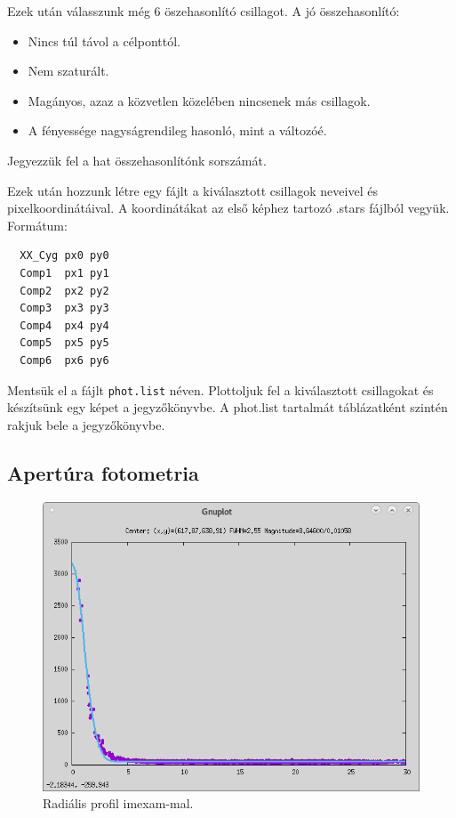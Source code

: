 \documentclass{article}
\begin{document}
Ezek után válasszunk még 6 öszehasonlító csillagot.
A jó összehasonlító:
\begin{itemize}
  \item Nincs túl távol a célponttól.
  \item Nem szaturált.
  \item Magányos, azaz a közvetlen közelében nincsenek más csillagok.
  \item A fényessége nagyságrendileg hasonló, mint a változóé.
\end{itemize}

Jegyezzük fel a hat összehasonlítónk sorszámát.

Ezek után hozzunk létre egy fájlt a kiválasztott csillagok neveivel és
pixelkoordinátáival. A koordinátákat az első képhez tartozó .stars fájlból
vegyük. Formátum:

\begin{verbatim}
  XX_Cyg px0 py0
  Comp1  px1 py1
  Comp2  px2 py2
  Comp3  px3 py3
  Comp4  px4 py4
  Comp5  px5 py5
  Comp6  px6 py6
\end{verbatim}

Mentsük el a fájlt \verb+phot.list+ néven. Plottoljuk fel a kiválasztott csillagokat
és készítsünk egy képet a jegyzőkönyvbe. A phot.list tartalmát táblázatként
szintén rakjuk bele a jegyzőkönyvbe.

\subsection{Apertúra fotometria}


\begin{figure}[ht!]
    \centering
    \includegraphics[width=0.7\linewidth]{pics/radialprofil.png}
    \caption{Radiális profil imexam-mal.}
    \label{radialp}
\end{figure}
\end{document}
